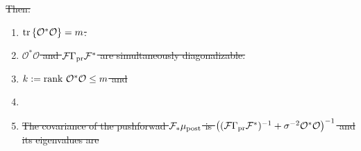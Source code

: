 \documentclass[ba]{imsart}
\newcommand{\obs}{\mathcal{O}}
\newcommand{\fwd}{\mathcal{F}}
\newcommand{\tar}{\Psi}
\DeclareMathOperator*{\argmax}{arg\,max}
\newcommand{\tr}[1]{\textup{tr}\left \{#1 \right \} }
\newcommand{\rank}{\textup{rank}\ }
\theoremstyle{plain}
\theoremstyle{definition}
\theoremstyle{remark}
\providecommand{\DIFdeltex}[1]{{\protect\color{red}\sout{#1}}}                      %
\providecommand{\DIFdelbegin}{} %
\providecommand{\DIFdel}[1]{\texorpdfstring{\DIFdeltex{#1}}{}} %
\newcommand{\DIFscaledelfig}{0.5}
\newlength{\DIFdelgraphicswidth} %
\newlength{\DIFdelgraphicsheight} %
\newcommand{\DIFdelincludegraphics}[2][]{%
\sbox{\DIFdelgraphicsbox}{\DIFOincludegraphics[#1]{#2}}%
\settoboxwidth{\DIFdelgraphicswidth}{\DIFdelgraphicsbox} %
\settoboxtotalheight{\DIFdelgraphicsheight}{\DIFdelgraphicsbox} %
\scalebox{\DIFscaledelfig}{%
\parbox[b]{\DIFdelgraphicswidth}{\usebox{\DIFdelgraphicsbox}\\[-\baselineskip] \rule{\DIFdelgraphicswidth}{0em}}\llap{\resizebox{\DIFdelgraphicswidth}{\DIFdelgraphicsheight}{%
\setlength{\unitlength}{\DIFdelgraphicswidth}%
\begin{picture}(1,1)%
\thicklines\linethickness{2pt} %
{\color[rgb]{1,0,0}\put(0,0){\framebox(1,1){}}}%
{\color[rgb]{1,0,0}\put(0,0){\line( 1,1){1}}}%
{\color[rgb]{1,0,0}\put(0,1){\line(1,-1){1}}}%
\end{picture}%
}\hspace*{3pt}}} %
} %
\DeclareRobustCommand{\DIFdelbegin}{\DIFOdelbegin \let\includegraphics\DIFdelincludegraphics} %
\begin{document}
\DIFdelbegin \DIFdel{Then:
  }%
\begin{enumerate}%
\item%
\DIFdel{\(\tr{\obs^*\obs} = m\).
}%
\item%
\DIFdel{\(\obs^*\obs\) and \(\fwd\prcov\fwd^*\) are simultaneously
    diagonalizable. }%
\item%
\DIFdel{\(k := \rank \obs^*\obs \leq m\) and
}%
\item%
\item%
\DIFdel{The covariance of the pushforwad \(\fwd_{*} \post\) is \(\left
    ( (\fwd \prcov \fwd^*)^{-1} + \sigma^{-2} \obs^*\obs \right
    )^{-1}\) and its eigenvalues are
}%

\end{enumerate}%
\end{document}

